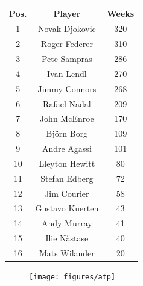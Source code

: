 \documentclass[a4paper,10pt]{book}
\theoremstyle{definition}
\newif\ifen
\newif\ifes
\newcommand{\en}[1]{\ifen#1\fi}
\newcommand{\es}[1]{\ifes#1\fi}
\begin{document}
%
\en{Finally, we use the \texttt{convergence()} method to obtain TrueSkill Through Time estimates explicitly selecting the convergence criterion: when the change between iterations is less than $0.01$ or when ten iterations are performed. }%
\es{Finalmente, usamos el método \texttt{convergence()} para obtener las estimaciones de TrueSkill Through Time, indicando expl\'icitamente el criterio de corte: cuando el cambio entre iteraciones sea menor a $0.01$, o cuando se alcanzan las $10$ iteraciones. }%
%
\begin{figure}[ht!]
\begin{subtable}[b]{0.29\textwidth}
    \scriptsize
    \begin{tabular}{c | c | c}
    Pos. &  Player                  &   Weeks\\
    \hline
    1       &   Novak Djokovic      &   320\\
    2       &   Roger Federer       &	310\\
    3       &	Pete Sampras        &   286\\
    4       &   Ivan Lendl          &   270\\
    5       &   Jimmy Connors       &   268\\
    6       &   Rafael Nadal        &   209\\
    7       &   John McEnroe        &   170\\
    8       &   Bj\"orn Borg        &   109\\
    9       &   Andre Agassi        &   101\\
    10      &   Lleyton Hewitt      &   80 \\
    11 	    &   Stefan Edberg       & 	72\\
    12 	    &   Jim Courier         & 	58\\
    13 	    &   Gustavo Kuerten     & 	43\\
    14 	    &   Andy Murray         & 	41\\
    15 	    &   Ilie N\u{a}stase    & 	40\\
    16 	    &   Mats Wilander       & 	20 \\
    \end{tabular}
    \caption{
    \en{Weeks at No. 1 }%
    \es{Semanas como No. 1 }%
    }
    \label{tab:atp_weeks}
\end{subtable}
%
\begin{subfigure}[b]{0.7\linewidth}
    \centering
    \texttt{[image: figures/atp]}
    \caption{
    \en{Estimated learning curves for some famous male players. }%
}
\end{subfigure}
\end{figure}
\end{document}
